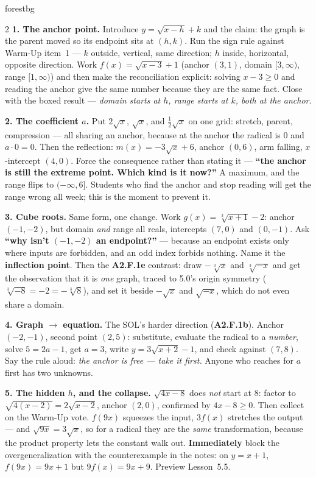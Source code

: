 \documentclass[10pt]{article}
\begin{document}
\begin{skillbox}[Lesson]{forestbg}
\begin{multicols}{2}
\textbf{1. The anchor point.} Introduce $y=\sqrt{x-h}+k$ and the claim: the graph is the parent moved
so its endpoint sits at $(h,k)$. Run the sign rule against Warm-Up item~1 --- $k$ outside, vertical,
same direction; $h$ inside, horizontal, opposite direction. Work $f(x)=\sqrt{x-3}+1$ (anchor $(3,1)$,
domain $[3,\infty)$, range $[1,\infty)$) and then make the reconciliation explicit: solving $x-3\ge0$
and reading the anchor give the same number because they are the same fact. Close with the boxed
result --- \emph{domain starts at $h$, range starts at $k$, both at the anchor}.

\textbf{2. The coefficient $a$.} Put $2\sqrt{x}$, $\sqrt{x}$, and $\frac12\sqrt{x}$ on one grid: stretch,
parent, compression --- all sharing an anchor, because at the anchor the radical is $0$ and $a\cdot0=0$.
Then the reflection: $m(x)=-3\sqrt{x}+6$, anchor $(0,6)$, arm falling, $x$-intercept $(4,0)$. Force the
consequence rather than stating it --- \textbf{``the anchor is still the extreme point. Which kind is
it now?''} A maximum, and the range flips to $(-\infty,6]$. Students who find the anchor and stop
reading will get the range wrong all week; this is the moment to prevent it.

\columnbreak

\textbf{3. Cube roots.} Same form, one change. Work $g(x)=\sqrt[3]{x+1}-2$: anchor $(-1,-2)$, but
domain \emph{and} range all reals, intercepts $(7,0)$ and $(0,-1)$. Ask \textbf{``why isn't $(-1,-2)$
an endpoint?''} --- because an endpoint exists only where inputs are forbidden, and an odd index
forbids nothing. Name it the \textbf{inflection point}. Then the \textbf{A2.F.1e} contrast: draw
$-\sqrt[3]{x}$ and $\sqrt[3]{-x}$ and get the observation that it is \emph{one} graph, traced to
5.0's origin symmetry ($\sqrt[3]{-8}=-2=-\sqrt[3]{8}$), and set it beside $-\sqrt{x}$ and
$\sqrt{-x}$, which do not even share a domain.

\textbf{4. Graph $\rightarrow$ equation.} The SOL's harder direction (\textbf{A2.F.1b}). Anchor
$(-2,-1)$, second point $(2,5)$: substitute, evaluate the radical to a \emph{number}, solve
$5=2a-1$, get $a=3$, write $y=3\sqrt{x+2}-1$, and check against $(7,8)$. Say the rule aloud:
\emph{the anchor is free --- take it first.} Anyone who reaches for $a$ first has two unknowns.

\textbf{5. The hidden $h$, and the collapse.} $\sqrt{4x-8}$ does \emph{not} start at $8$: factor to
$\sqrt{4(x-2)}=2\sqrt{x-2}$, anchor $(2,0)$, confirmed by $4x-8\ge0$. Then collect on the Warm-Up
vote. $f(9x)$ squeezes the input, $3f(x)$ stretches the output --- and $\sqrt{9x}=3\sqrt{x}$, so for a
radical they are the \emph{same} transformation, because the product property lets the constant walk
out. \textbf{Immediately} block the overgeneralization with the counterexample in the notes: on
$y=x+1$, $f(9x)=9x+1$ but $9f(x)=9x+9$. Preview Lesson~5.5.
\end{multicols}
\end{skillbox}
\end{document}
